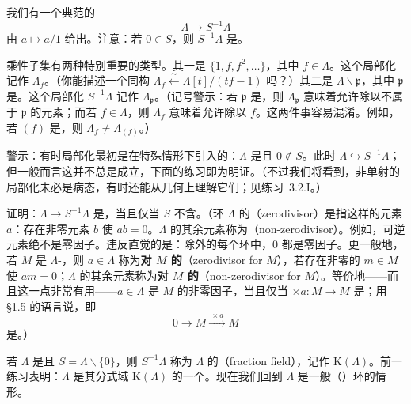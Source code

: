 我们有一个典范的\trRingMorphism
\begin{equation*}\tag{1.2.3.1}\label{eq:canonical-map-to-localization}
\Lambda\longrightarrow S^{-1}\Lambda
\end{equation*}
由 $a\mapsto a/1$ 给出。注意：若 $0\in S$，则 $S^{-1}\Lambda$ 是\trZeroRing。

乘性子集有两种特别重要的类型。其一是 $\{1,f,f^2,\dots\}$，其中 $f\in\Lambda$。这个局部化记作 $\Lambda_f$。（你能描述一个同构 $\Lambda_f\xleftarrow{\ \sim\ }\Lambda[t]/(tf-1)$ 吗？）其二是 $\Lambda\smallsetminus\mathfrak{p}$，其中 $\mathfrak{p}$ 是\trPrimeIdeal。这个局部化 $S^{-1}\Lambda$ 记作 $\Lambda_{\mathfrak{p}}$。（记号警示：若 $\mathfrak{p}$ 是\trPrimeIdeal，则 $\Lambda_{\mathfrak{p}}$ 意味着允许除以不属于 $\mathfrak{p}$ 的元素；而若 $f\in\Lambda$，则 $\Lambda_f$ 意味着允许除以 $f$。这两件事容易混淆。例如，若 $(f)$ 是\trPrimeIdeal，则 $\Lambda_f\neq\Lambda_{(f)}$。）

警示：有时局部化最初是在特殊情形下引入的：$\Lambda$ 是\trIntegralDomain{}且 $0\notin S$。此时 $\Lambda\hookrightarrow S^{-1}\Lambda$；但一般而言这并不总是成立，下面的练习即为明证。（不过我们将看到，非单射的局部化未必是病态，有时还能从几何上理解它们；见练习~3.2.I。）

\begin{exercise}\label{ex:when-localization-is-injective}
证明：$\Lambda\to S^{-1}\Lambda$ 是\trInjectiveMap，当且仅当 $S$ 不含\trZerodivisor。（环 $\Lambda$ 的\textbf{\trZerodivisor}（zerodivisor）是指这样的元素 $a$：存在非零元素 $b$ 使 $ab=0$。$\Lambda$ 的其余元素称为\textbf{\trNonZerodivisor}（non-zerodivisor）。例如，可逆元素绝不是零因子。违反直觉的是：除\trZeroRing{}外的每个环中，$0$ 都是零因子。更一般地，若 $M$ 是 $\Lambda$-\trModule，则 $a\in\Lambda$ 称为\textbf{对 $M$ 的\trZerodivisor}（zerodivisor for $M$），若存在非零的 $m\in M$ 使 $am=0$；$\Lambda$ 的其余元素称为\textbf{对 $M$ 的\trNonZerodivisor}（non-zerodivisor for $M$）。等价地——而且这一点非常有用——$a\in\Lambda$ 是 $M$ 的非零因子，当且仅当 $\times a\colon M\to M$ 是\trInjection；用 \S1.5 的语言说，即
\[
0\longrightarrow M\mathrel{\xrightarrow{\ \times a\ }}M
\]
是\trExactSequence。）
\end{exercise}

若 $\Lambda$ 是\trIntegralDomain{}且 $S=\Lambda\smallsetminus\{0\}$，则 $S^{-1}\Lambda$ 称为 $\Lambda$ 的\textbf{\trFractionField}（fraction field），记作 $\mathrm{K}(\Lambda)$。前一练习表明：$\Lambda$ 是其分式域 $\mathrm{K}(\Lambda)$ 的一个\trSubring。现在我们回到 $\Lambda$ 是一般（\trCommutative）环的情形。

